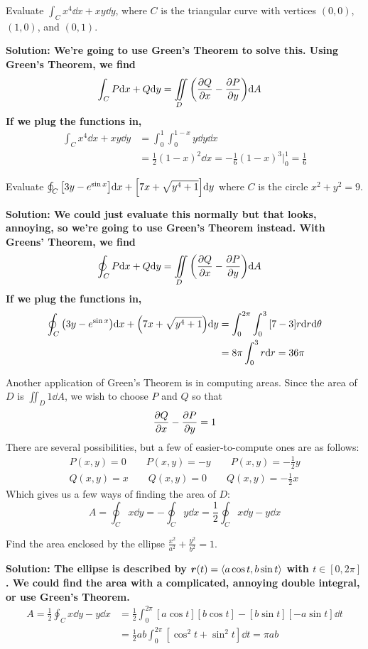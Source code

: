 \begin{example}
    Evaluate $\int_C x^4\dd x+xy\dd y$, where $C$ is the triangular curve with vertices $(0,0)$, $(1,0)$, and $(0, 1)$.\par
    \bf{Solution:} We're going to use Green's Theorem to solve this. Using Green's Theorem, we find
    \begin{align*}
        \int_C P\dd x + Q\dd y &= \iint\limits_D \pqty{\pdv{Q}{x}-\pdv{P}{y}}\dd A
    \end{align*}
    If we plug the functions in,
    \begin{align*}
        \int_C x^4\dd x + xy\dd y &= \int_0^1 \int_0^{1-x} y\dd y\dd x \\
        &= \frac{1}{2}(1-x)^2\dd x = -\frac{1}{6}(1-x)^3\biggr|_0^1 = \frac{1}{6}
    \end{align*}
\end{example}
\begin{example}
    Evaluate $\oint_C \bqty{3y-e^{\sin x}}\dd x + \bqty{7x+\sqrt{y^4+1}}\dd y$ where $C$ is the circle $x^2+y^2=9$.\par
    \bf{Solution:} We could just evaluate this normally but that looks, annoying, so we're going to use Green's Theorem instead. With Greens' Theorem, we find
    \begin{align*}
        \oint_C P\dd x + Q\dd y &= \iint\limits_D \pqty{\pdv{Q}{x}-\pdv{P}{y}}\dd A
    \end{align*}
    If we plug the functions in,
    \begin{align*}
        \oint_C \pqty{3y-e^{\sin x}}\dd x + \pqty{7x+\sqrt{y^4+1}}\dd y &= \int_0^{2\pi}\int_0^3 \bqty{7-3}r\dd r\dd \theta \\
        &= 8\pi\int_0^3 r\dd r = 36\pi
    \end{align*}
\end{example}
Another application of Green's Theorem is in computing areas. Since the area of $D$ is $\iint_D 1\dd A$, we wish to choose $P$ and $Q$ so that
\[ \pdv{Q}{x} - \pdv{P}{y} = 1\]
There are several possibilities, but a few of easier-to-compute ones are as follows:
\begin{align*}
    P(x,y) = 0 \qquad P(x,y) = -y \qquad P(x,y) = -\frac{1}{2}y \\
    Q(x,y) = x \qquad Q(x,y) = 0 \qquad Q(x,y) = -\frac{1}{2}x
\end{align*}
Which gives us a few ways of finding the area of $D$:
\[A = \oint_C x\dd y = -\oint_C y\dd x = \frac{1}{2}\oint_C x\dd y- y\dd x\]
\begin{example}
    Find the area enclosed by the ellipse $\frac{x^2}{a^2} + \frac{y^2}{b^2}=1$. \par
    \bf{Solution:} The ellipse is described by $\boldsymbol{r}(t) = \left\langle a\cos t, b\sin t\right\rangle$ with $t\in[0, 2\pi]$. We could find the area with a complicated, annoying double integral, or use Green's Theorem.
    \begin{align*}
        A = \frac{1}{2}\oint_C x\dd y - y\dd x &= \frac{1}{2}\int_0^{2\pi}[a\cos t][b \cos t] - [b\sin t][-a\sin t]\dd t \\
        &= \frac{1}{2}ab\int_0^{2\pi}[\cos^2 t+ \sin^2t]\dd t = \pi ab
    \end{align*}
\end{example}
